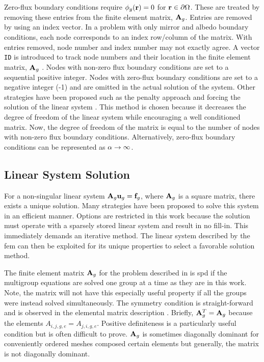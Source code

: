     Zero-flux boundary conditions require $\phi_g(\mathbf{r}) = 0$ for $\mathbf{r} \in
    \partial \Omega$. These are treated by removing these entries from the
    finite element matrix, $\mathbf{A}_g$. Entries are removed by using an index vector.
    In a problem with only mirror and albedo boundary conditions, each node
    corresponds to an index row/column of the matrix. With entries removed, node
    number and index number may not exactly agree. A vector \texttt{ID} is
    introduced to track node numbers and their location in the finite element
    matrix, $\mathbf{A}_g$ \cite{textbookjohnson}. Nodes with non-zero flux boundary
    conditions are set to a sequential positive integer. Nodes with zero-flux
    boundary conditions are set to a negative integer (-1) and are omitted in
    the actual solution of the system. Other strategies have been proposed such
    as the penalty approach \cite{textbookhughes} and forcing the solution of
    the linear system \cite{textbookli}. This method is chosen because it
    decreases the degree of freedom of the linear system while encouraging a
    well conditioned matrix.  Now, the degree of freedom of the matrix is equal
    to the number of nodes with non-zero flux boundary conditions.
    Alternatively, zero-flux boundary conditions can be represented as $\alpha
    \rightarrow \infty$.
    
  \subsection{Linear System Solution}
    \label{sec:linear_system_solution}
    For a non-singular linear system $\mathbf{A}_g \mathbf{u}_g = \mathbf{f}_g$, where $\mathbf{A}_g$ is a 
    square matrix, there exists a unique solution. Many strategies have been 
    proposed to solve this system in an efficient manner. Options are restricted
    in this work because the solution must operate with a sparsely stored linear
    system and result in no fill-in. This immediately demands an iterative
    method. The linear system described by the \gls{fem} can then be exploited
    for its unique properties to select a favorable solution method.
    
    The finite element matrix $\mathbf{A}_g$ for the problem described in
     is \gls{spd} if the multigroup equations are
    solved one group at a time as they are in this work. Note, the matrix will 
    not have this especially useful property if all the groups were instead
    solved simultaneously. The symmetry condition is straight-forward and is
    observed in the elemental matrix description .
    Briefly, $\mathbf{A}_g^T = \mathbf{A}_g$ because the elements ${A_{i,j,g,e}=A_{j,i,g,e}}$.
    Positive definiteness is a particularly useful condition but is often
    difficult to prove. $\mathbf{A}_g$ is sometimes diagonally dominant for
    conveniently ordered meshes composed certain elements but generally, the
    matrix is not diagonally dominant. 
    

